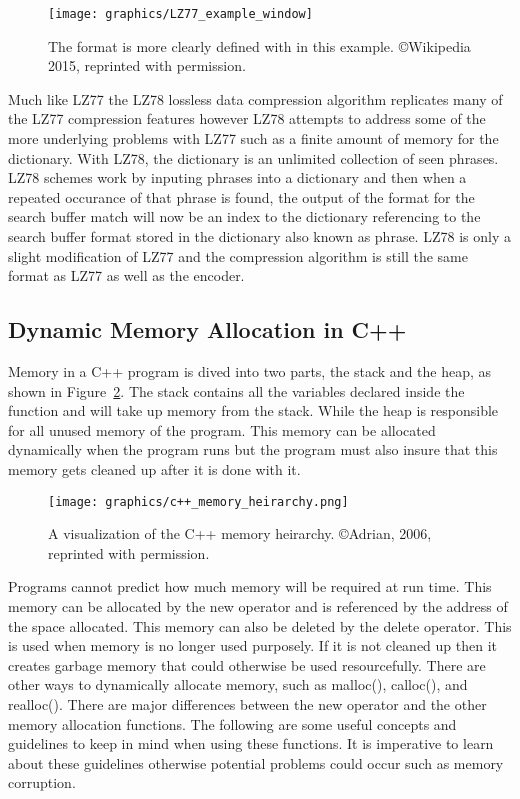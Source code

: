 \documentclass[letterpaper, 12pt]{article}
\begin{document}
\begin{figure}
  \centering
  \texttt{[image: graphics/LZ77\_example\_window]}
  \caption{The format is more clearly defined with in this example. \copyright Wikipedia 2015, reprinted with permission.\cite{LZ77_78}}
  \label{fig:lz77_format}
\end{figure}

Much like LZ77 the LZ78 lossless data compression algorithm replicates many of the LZ77 compression features however
LZ78 attempts to address some of the more underlying problems with LZ77 such as a finite amount of memory for
the dictionary. With LZ78, the dictionary is an unlimited collection of seen phrases. LZ78 schemes work by inputing
phrases into a dictionary and then when a repeated occurance of that phrase is found, the output of the format for
the search buffer match will now be an index to the dictionary referencing to the search buffer format stored in
the dictionary also known as phrase. LZ78 is only a slight modification of LZ77 and the compression algorithm is still
the same format as LZ77 as well as the encoder.

\newpage

\subsection{Dynamic Memory Allocation in C++}
Memory in a C++ program is dived into two parts, the stack and the heap, as shown in Figure~\ref{fig:cpp_mem_heirarchy}. The stack contains all the 
variables declared inside the function and will take up memory from the stack. While the heap is responsible 
for all unused memory of the program. This memory can be allocated dynamically when the program runs but 
the program must also insure that this memory gets cleaned up after it is done with it.
\par\vspace{\baselineskip}

\begin{figure}
  \centering
  \texttt{[image: graphics/c++\_memory\_heirarchy.png]}
  \caption{A visualization of the C++ memory heirarchy. \copyright Adrian, 2006, reprinted with permission. \cite{stackheap}}
  \label{fig:cpp_mem_heirarchy}
\end{figure}

Programs cannot predict how much memory will be required at run time. This memory can be allocated 
by the new operator and is referenced by the address of the space allocated. This memory can 
also be deleted by the delete operator. This is used when memory is no longer used purposely. 
If it is not cleaned up then it creates garbage memory that could otherwise be used resourcefully. 
There are other ways to dynamically allocate memory, such as malloc(), calloc(), and realloc(). 
There are major differences between the new operator and the other memory allocation functions.  
The following are some useful concepts and guidelines to keep in mind when using these functions. 
It is imperative to learn about these guidelines otherwise potential problems could occur 
such as memory corruption. \cite{newerror}
\end{document}

